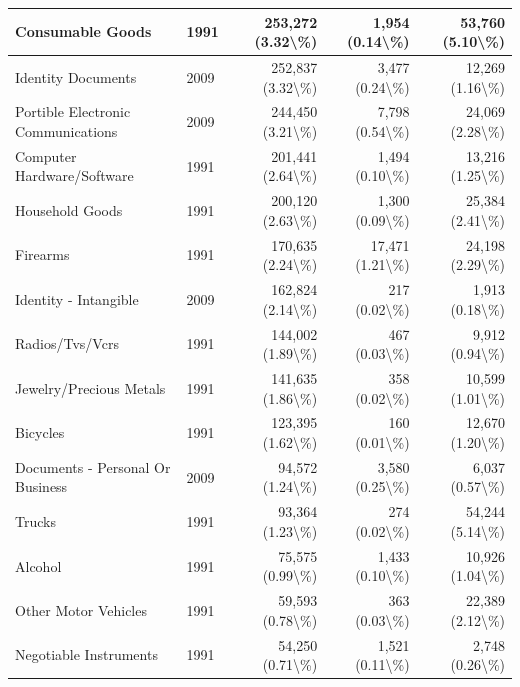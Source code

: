 \documentclass[
]{krantz}
\begin{document}
\begin{longtable}[t]{l|l|r|r|r}
\hline
Consumable Goods & 1991 & 253,272 (3.32\textbackslash{}\%) & 1,954 (0.14\textbackslash{}\%) & 53,760 (5.10\textbackslash{}\%)\\
\hline
Identity Documents & 2009 & 252,837 (3.32\textbackslash{}\%) & 3,477 (0.24\textbackslash{}\%) & 12,269 (1.16\textbackslash{}\%)\\
\hline
Portible Electronic Communications & 2009 & 244,450 (3.21\textbackslash{}\%) & 7,798 (0.54\textbackslash{}\%) & 24,069 (2.28\textbackslash{}\%)\\
\hline
Computer Hardware/Software & 1991 & 201,441 (2.64\textbackslash{}\%) & 1,494 (0.10\textbackslash{}\%) & 13,216 (1.25\textbackslash{}\%)\\
\hline
Household Goods & 1991 & 200,120 (2.63\textbackslash{}\%) & 1,300 (0.09\textbackslash{}\%) & 25,384 (2.41\textbackslash{}\%)\\
\hline
Firearms & 1991 & 170,635 (2.24\textbackslash{}\%) & 17,471 (1.21\textbackslash{}\%) & 24,198 (2.29\textbackslash{}\%)\\
\hline
Identity - Intangible & 2009 & 162,824 (2.14\textbackslash{}\%) & 217 (0.02\textbackslash{}\%) & 1,913 (0.18\textbackslash{}\%)\\
\hline
Radios/Tvs/Vcrs & 1991 & 144,002 (1.89\textbackslash{}\%) & 467 (0.03\textbackslash{}\%) & 9,912 (0.94\textbackslash{}\%)\\
\hline
Jewelry/Precious Metals & 1991 & 141,635 (1.86\textbackslash{}\%) & 358 (0.02\textbackslash{}\%) & 10,599 (1.01\textbackslash{}\%)\\
\hline
Bicycles & 1991 & 123,395 (1.62\textbackslash{}\%) & 160 (0.01\textbackslash{}\%) & 12,670 (1.20\textbackslash{}\%)\\
\hline
Documents - Personal Or Business & 2009 & 94,572 (1.24\textbackslash{}\%) & 3,580 (0.25\textbackslash{}\%) & 6,037 (0.57\textbackslash{}\%)\\
\hline
Trucks & 1991 & 93,364 (1.23\textbackslash{}\%) & 274 (0.02\textbackslash{}\%) & 54,244 (5.14\textbackslash{}\%)\\
\hline
Alcohol & 1991 & 75,575 (0.99\textbackslash{}\%) & 1,433 (0.10\textbackslash{}\%) & 10,926 (1.04\textbackslash{}\%)\\
\hline
Other Motor Vehicles & 1991 & 59,593 (0.78\textbackslash{}\%) & 363 (0.03\textbackslash{}\%) & 22,389 (2.12\textbackslash{}\%)\\
\hline
Negotiable Instruments & 1991 & 54,250 (0.71\textbackslash{}\%) & 1,521 (0.11\textbackslash{}\%) & 2,748 (0.26\textbackslash{}\%)\\

\end{longtable}
\end{document}

